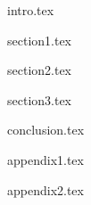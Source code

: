 \documentclass{spbseu}
\begin{document}

\maketitle

\newpage

\setcounter{page}{2}
\tableofcontents

\newpage

{intro.tex}

\newpage

{section1.tex}

\newpage

{section2.tex}

\newpage

{section3.tex}

\newpage

{conclusion.tex}

\newpage

\nocite{*}
\printbibliography

\newpage

{appendix1.tex}

\newpage

{appendix2.tex}
\end{document}
